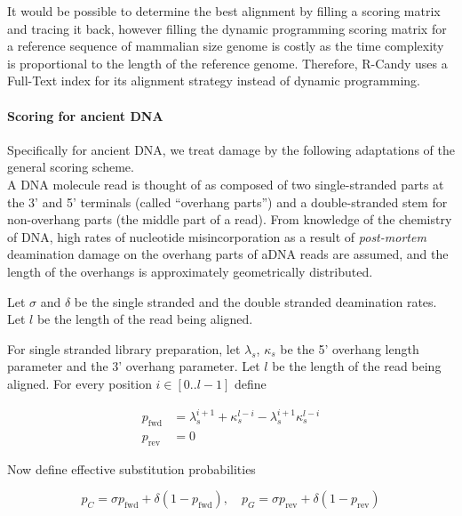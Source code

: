 \documentclass[11pt,a4paper]{report}
\begin{document}
It would be possible to determine the best alignment by filling a 
scoring matrix and tracing it back, however filling the dynamic 
programming scoring matrix for a reference sequence of mammalian 
size genome is costly as the time complexity is proportional to 
the length of the reference genome. Therefore, R-Candy uses a 
Full-Text index for its alignment strategy instead of dynamic 
programming. 



\paragraph{Scoring for ancient DNA} \label{Scoring}


Specifically for ancient DNA, we treat damage by the following
adaptations of the general scoring scheme.\\
A DNA molecule read is thought of as composed of two single-stranded parts at 
the 3' and 5' terminals (called ``overhang parts'') and a 
double-stranded stem for non-overhang parts (the middle part of
a read). From knowledge of the chemistry of DNA\cite{DNAchemistry}, high rates 
of nucleotide misincorporation as a result of \emph{post-mortem} 
deamination damage on the overhang parts of aDNA reads are assumed, and
the length of the overhangs is approximately 
geometrically distributed\cite{mapdamage2}. 

Let $\sigma$ and $\delta$ be the single stranded and the double stranded
deamination rates.  Let $l$ be the length of the read being aligned.  

For single stranded library preparation, let $\lambda_s$, $\kappa_s$ be
the 5' overhang length parameter and the 3' overhang parameter.  Let $l$
be the length of the read being aligned.  For every position $i \in
[0..l-1]$ define

\begin{align*}
p_{\mbox{fwd}} &= \lambda_s^{i+1} + \kappa_s^{l-i} - \lambda_s^{i+1} \kappa_s^{l-i} \\
p_{\mbox{rev}} &= 0
\end{align*}

Now define effective substitution probabilities

\begin{equation*}
p_{C} = \sigma p_{\mbox{fwd}} + \delta (1 - p_{\mbox{fwd}}), \quad
p_{G} = \sigma p_{\mbox{rev}} + \delta (1 - p_{\mbox{rev}}) 
\end{equation*}
\end{document}
